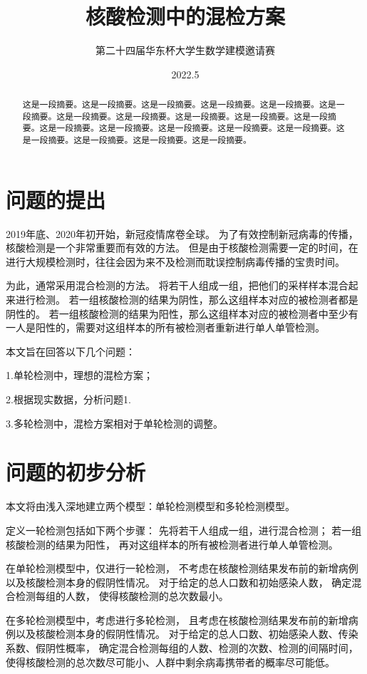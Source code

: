 \documentclass[12pt]{article}
\title{核酸检测中的混检方案}
\author{第二十四届华东杯大学生数学建模邀请赛}
\date{2022.5}
\begin{document}
\maketitle

\begin{abstract}
这是一段摘要。这是一段摘要。这是一段摘要。这是一段摘要。这是一段摘要。这是一段摘要。这是一段摘要。这是一段摘要。这是一段摘要。这是一段摘要。这是一段摘要。这是一段摘要。这是一段摘要。这是一段摘要。这是一段摘要。这是一段摘要。这是一段摘要。这是一段摘要。这是一段摘要。这是一段摘要。
\end{abstract}

\newpage
\tableofcontents

\newpage
{\centering\section{问题的提出}}

2019年底、2020年初开始，新冠疫情席卷全球。
为了有效控制新冠病毒的传播，核酸检测是一个非常重要而有效的方法。
但是由于核酸检测需要一定的时间，在进行大规模检测时，往往会因为来不及检测而耽误控制病毒传播的宝贵时间。

为此，通常采用混合检测的方法。
将若干人组成一组，把他们的采样样本混合起来进行检测。
若一组核酸检测的结果为阴性，那么这组样本对应的被检测者都是阴性的。
若一组核酸检测的结果为阳性，那么这组样本对应的被检测者中至少有一人是阳性的，需要对这组样本的所有被检测者重新进行单人单管检测。

本文旨在回答以下几个问题：

1.单轮检测中，理想的混检方案；

2.根据现实数据，分析问题1.

3.多轮检测中，混检方案相对于单轮检测的调整。

{\centering\section{问题的初步分析}}

本文将由浅入深地建立两个模型：单轮检测模型和多轮检测模型。

定义一轮检测包括如下两个步骤：
先将若干人组成一组，进行混合检测；
若一组核酸检测的结果为阳性，
再对这组样本的所有被检测者进行单人单管检测。

在单轮检测模型中，仅进行一轮检测，
不考虑在核酸检测结果发布前的新增病例以及核酸检测本身的假阴性情况。
对于给定的总人口数和初始感染人数，
确定混合检测每组的人数，
使得核酸检测的总次数最小。

在多轮检测模型中，考虑进行多轮检测，
且考虑在核酸检测结果发布前的新增病例以及核酸检测本身的假阴性情况。
对于给定的总人口数、初始感染人数、传染系数、假阴性概率，
确定混合检测每组的人数、检测的次数、检测的间隔时间，
使得核酸检测的总次数尽可能小、人群中剩余病毒携带者的概率尽可能低。
\end{document}
